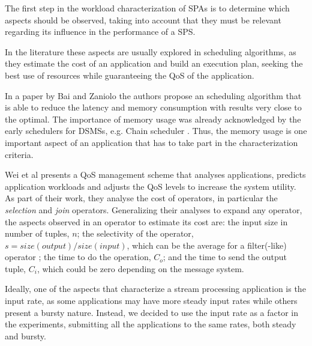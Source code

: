 \documentclass[ppgc,diss,english]{iiufrgs}
\begin{document}


The first step in the workload characterization of SPAs is to determine which aspects should be observed, taking into account that they must be relevant regarding its influence in the performance of a SPS.

In the literature these aspects are usually explored in scheduling algorithms, as they estimate the cost of an application and build an execution plan, seeking the best use of resources while guaranteeing the QoS of the application.

In a paper by Bai and Zaniolo \cite{bai2008minimizing} the authors propose an scheduling algorithm that is able to reduce the latency and memory consumption with results very close to the optimal. The importance of memory usage was already acknowledged by the early schedulers for DSMSs, e.g. Chain scheduler \cite{babcock2003chain}. Thus, the memory usage is one important aspect of an application that has to take part in the characterization criteria.

Wei et al \cite{wei2006prediction} presents a QoS management scheme that analyses applications, predicts application workloads and adjusts the QoS levels to increase the system utility. As part of their work, they analyse the cost of operators, in particular the \emph{selection} and \emph{join} operators. Generalizing their analyses to expand any operator, the aspects observed in an operator to estimate its cost are: the input size in number of tuples, $n$; the selectivity of the operator, $s = size(output)/size(input)$, which can be the average for a filter(-like) operator \cite{babcock2004operator}; the time to do the operation, $C_{o}$; and the time to send the output tuple, $C_{i}$, which could be zero depending on the message system.

Ideally, one of the aspects that characterize a stream processing application is the input rate, as some applications may have more steady input rates while others present a bursty nature. Instead, we decided to use the input rate as a factor in the experiments, submitting all the applications to the same rates, both steady and bursty.
\end{document}

